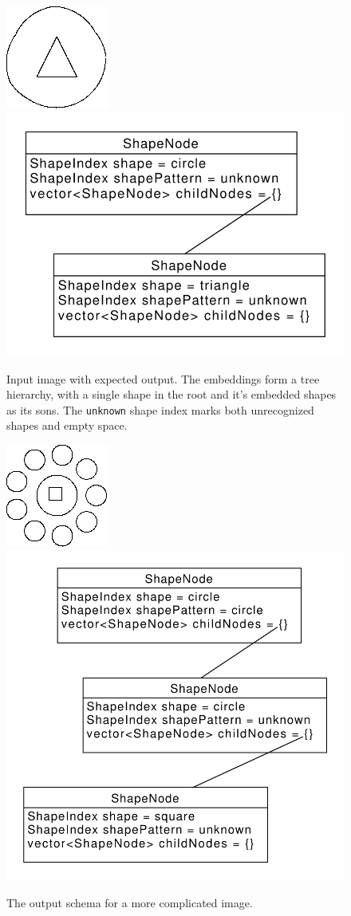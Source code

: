\begin{description}
\begin{figure}[p]
\centering
\includegraphics[width=.3\linewidth]{ext/images/example_output0.png}
\quad
\includegraphics[width=.3\linewidth]{ext/images/example_output0.pdf}
\caption{Input image with expected output. The embeddings form a tree hierarchy, with a single shape in the root and it's embedded shapes as its sons. The \texttt{unknown} shape index marks both unrecognized shapes and empty space.}
\label{fig:output0}
\end{figure}

\begin{figure}[p]
\centering
\includegraphics[width=.3\linewidth]{ext/images/example_output1.png}
\quad
\includegraphics[width=.3\linewidth]{ext/images/example_output1.pdf}
\caption{The output schema for a more complicated image. }
\label{fig:output1}
\end{figure}


\end{description}

